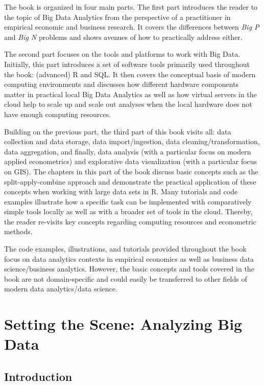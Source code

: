 \documentclass[
  12pt,
]{style/krantz}
\begin{document}
The book is organized in four main parts. The first part introduces the reader to the topic of Big Data Analytics from the perspective of a practitioner in empirical economic and business research. It covers the differences between \emph{Big P} and \emph{Big N} problems and shows avenues of how to practically address either.

The second part focuses on the tools and platforms to work with Big Data. Initially, this part introduces a set of software tools primarily used throughout the book: (advanced) R and SQL. It then covers the conceptual basis of modern computing environments and discusses how different hardware components matter in practical local Big Data Analytics as well as how virtual servers in the cloud help to scale up and scale out analyses when the local hardware does not have enough computing resources.

Building on the previous part, the third part of this book visits all: data collection and data storage, data import/ingestion, data cleaning/transformation, data aggregation, and finally, data analysis (with a particular focus on modern applied econometrics) and explorative data visualization (with a particular focus on GIS). The chapters in this part of the book discuss basic concepts such as the split-apply-combine approach and demonstrate the practical application of these concepts when working with large data sets in R. Many tutorials and code examples illustrate how a specific task can be implemented with comparatively simple tools locally as well as with a broader set of tools in the cloud. Thereby, the reader re-visits key concepts regarding computing resources and econometric methods.

The code examples, illustrations, and tutorials provided throughout the book focus on data analytics contexts in empirical economics as well as business data science/business analytics. However, the basic concepts and tools covered in the book are not domain-specific and could easily be transferred to other fields of modern data analytics/data science.

\hypertarget{part-setting-the-scene-analyzing-big-data}{%
\part{Setting the Scene: Analyzing Big Data}\label{part-setting-the-scene-analyzing-big-data}}

\hypertarget{s}{%
\chapter*{Introduction}\label{s}}
\end{document}
